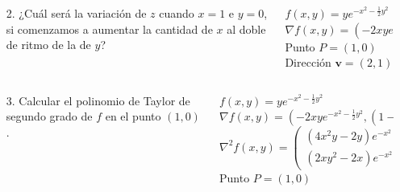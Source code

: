 \documentclass[aspectratio=149,10pt,t]{beamer}
\begin{document}
\begin{frame}
\begin{columns}
\begin{column}[T]{0.45\textwidth}
\begin{enumerate}
  \item[2.] ¿Cuál será la variación de $z$ cuando $x=1$ e $y=0$, si comenzamos a aumentar la cantidad de $x$ al doble de ritmo de la de $y$?
\end{enumerate}
\end{column}
\begin{column}[T]{0.55\textwidth}
\begin{datos}
$f(x,y)=ye^{-x^2-\frac{1}{2}y^2}$\\
$\nabla f(x,y)=\left(-2xye^{-x^2-\frac{1}{2}y^2}, (1-y^2)e^{-x^2-\frac{1}{2}y^2}\right)$\\
Punto $P=(1,0)$\\
Dirección $\mathbf{v}=(2,1)$
\end{datos}
\end{column}
\end{columns}
\end{frame}


\begin{frame}
\begin{columns}
\begin{column}[T]{0.3\textwidth}
\begin{enumerate}
  \item[3.] Calcular el polinomio de Taylor de segundo grado de $f$ en el punto $(1,0)$.
\end{enumerate}
\end{column}
\begin{column}[T]{0.7\textwidth}
\begin{datos}
$f(x,y)=ye^{-x^2-\frac{1}{2}y^2}$\\
$\nabla f(x,y)=\left(-2xye^{-x^2-\frac{1}{2}y^2}, (1-y^2)e^{-x^2-\frac{1}{2}y^2}\right)$\\
$\nabla^2f(x,y)=\left(
\begin{array}{cc}
  (4x^2y-2y)e^{-x^2-\frac{1}{2}y^2} & (2xy^2-2x)e^{-x^2-\frac{1}{2}y^2}\\
  (2xy^2-2x)e^{-x^2-\frac{1}{2}y^2} & (y^3-3y)e^{-x^2-\frac{1}{2}y^2}
\end{array}
\right)$\\
Punto $P=(1,0)$
\end{datos}
\end{column}
\end{columns}
\end{frame}
\end{document}
